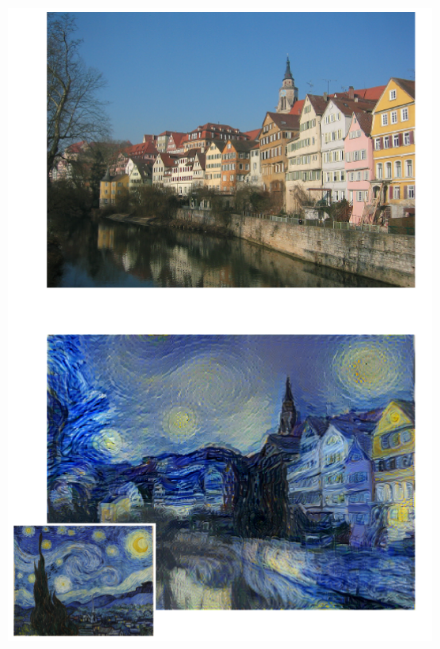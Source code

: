 \documentclass[11pt,xcolor=dvipsnames]{beamer}
\begin{document}
\begin{frame}
\begin{multicols*}{2}
\begin{figure}
\includegraphics[scale=0.2]{styletransfergatysetal.png}
\end{figure}

\end{multicols*}
\end{frame}
\end{document}

